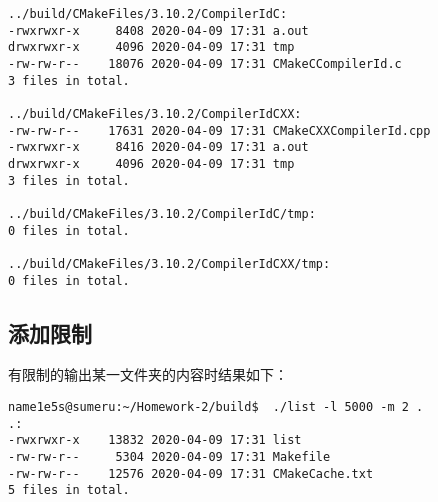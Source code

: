 \documentclass[blue,normal,cn]{elegantnote}
\begin{document}
\begin{lstlisting}
../build/CMakeFiles/3.10.2/CompilerIdC:
-rwxrwxr-x     8408 2020-04-09 17:31 a.out
drwxrwxr-x     4096 2020-04-09 17:31 tmp
-rw-rw-r--    18076 2020-04-09 17:31 CMakeCCompilerId.c
3 files in total.

../build/CMakeFiles/3.10.2/CompilerIdCXX:
-rw-rw-r--    17631 2020-04-09 17:31 CMakeCXXCompilerId.cpp
-rwxrwxr-x     8416 2020-04-09 17:31 a.out
drwxrwxr-x     4096 2020-04-09 17:31 tmp
3 files in total.

../build/CMakeFiles/3.10.2/CompilerIdC/tmp:
0 files in total.

../build/CMakeFiles/3.10.2/CompilerIdCXX/tmp:
0 files in total.
\end{lstlisting}

\subsection{添加限制}
有限制的输出某一文件夹的内容时结果如下：

\begin{lstlisting}
name1e5s@sumeru:~/Homework-2/build$  ./list -l 5000 -m 2 .
.:
-rwxrwxr-x    13832 2020-04-09 17:31 list
-rw-rw-r--     5304 2020-04-09 17:31 Makefile
-rw-rw-r--    12576 2020-04-09 17:31 CMakeCache.txt
5 files in total.

\end{lstlisting}
\end{document}
